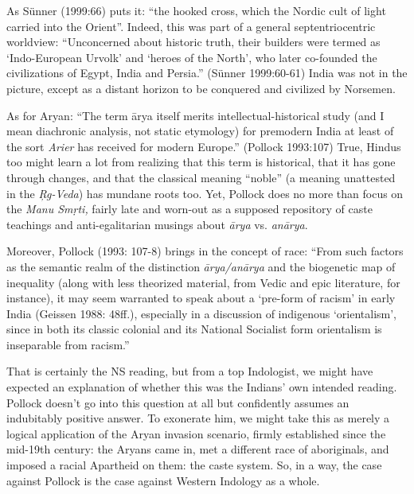 As Sünner (1999:66) puts it: “the hooked cross, which the Nordic cult of light carried into the Orient”. Indeed, this was part of a general septentriocentric worldview: “Unconcerned about historic truth, their builders were termed as ‘Indo-European Urvolk’ and ‘heroes of the North’, who later co-founded the civilizations of Egypt, India and Persia.” (Sünner 1999:60-61) India was not in the picture, except as a distant horizon to be conquered and civilized by Norsemen.

As for Aryan: “The term ārya itself merits intellectual-historical study (and I mean diachronic analysis, not static etymology) for premodern India at least of the sort {\sl Arier} has received for modern Europe.” (Pollock 1993:107) True, Hindus too might learn a lot from realizing that this term is historical, that it has gone through changes, and that the classical meaning “noble” (a meaning unattested in the {\sl Ŗg-Veda}) has mundane roots too. Yet, Pollock does no more than focus on the {\sl Manu Smṛti,} fairly late and worn-out as a supposed repository of caste teachings and anti-egalitarian musings about {\sl ārya} vs. {\sl anārya}.

Moreover, Pollock (1993: 107-8) brings in the concept of race: 
“From such factors as the semantic realm of the distinction {\sl ārya/anārya} and the biogenetic map of inequality (along with less theorized material, from Vedic and epic literature, for instance), it may seem warranted to speak about a ‘pre-form of racism’ in early India (Geissen 1988: 48ff.), especially in a discussion of indigenous ‘orientalism’, since in both its classic colonial and its National Socialist form orientalism is inseparable from racism.” 

That is certainly the NS reading, but from a top Indologist, we might have expected an explanation of whether this was the Indians’ own intended reading. Pollock doesn’t go into this question at all but confidently assumes an indubitably positive answer. To exonerate him, we might take this as merely a logical application of the Aryan invasion scenario, firmly established since the mid-19th century: the Aryans came in, met a different race of aboriginals, and imposed a racial Apartheid on them: the caste system. So, in a way, the case against Pollock is the case against Western Indology as a whole.

